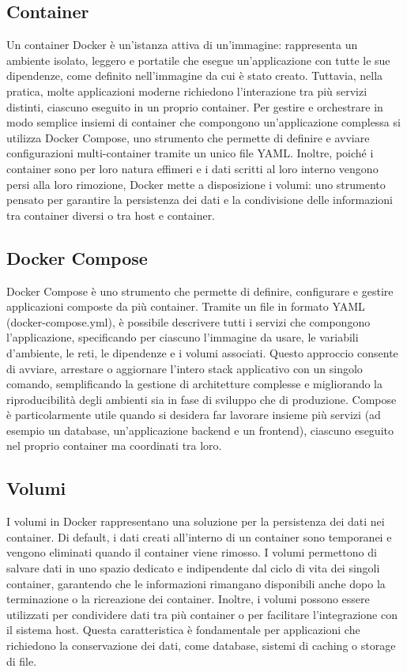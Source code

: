 \subsection{Container}
\label{sec:container}
Un container Docker è un’istanza attiva di un’immagine: rappresenta un ambiente isolato, leggero e portatile che esegue un’applicazione con tutte le sue dipendenze, come definito nell’immagine da cui è stato creato. Tuttavia, nella pratica, molte applicazioni moderne richiedono l’interazione tra più servizi distinti, ciascuno eseguito in un proprio container. Per gestire e orchestrare in modo semplice insiemi di container che compongono un’applicazione complessa si utilizza Docker Compose, uno strumento che permette di definire e avviare configurazioni multi-container tramite un unico file YAML.
Inoltre, poiché i container sono per loro natura effimeri e i dati scritti al loro interno vengono persi alla loro rimozione, Docker mette a disposizione i volumi: uno strumento pensato per garantire la persistenza dei dati e la condivisione delle informazioni tra container diversi o tra host e container.

\subsection{Docker Compose}
\label{sec:dockercompose}
Docker Compose è uno strumento che permette di definire, configurare e gestire applicazioni composte da più container. Tramite un file in formato YAML (docker-compose.yml), è possibile descrivere tutti i servizi che compongono l’applicazione, specificando per ciascuno l’immagine da usare, le variabili d’ambiente, le reti, le dipendenze e i volumi associati. Questo approccio consente di avviare, arrestare o aggiornare l’intero stack applicativo con un singolo comando, semplificando la gestione di architetture complesse e migliorando la riproducibilità degli ambienti sia in fase di sviluppo che di produzione. Compose è particolarmente utile quando si desidera far lavorare insieme più servizi (ad esempio un database, un’applicazione backend e un frontend), ciascuno eseguito nel proprio container ma coordinati tra loro.

\subsection{Volumi}
\label{sec:volumi}
I volumi in Docker rappresentano una soluzione per la persistenza dei dati nei container. Di default, i dati creati all’interno di un container sono temporanei e vengono eliminati quando il container viene rimosso. I volumi permettono di salvare dati in uno spazio dedicato e indipendente dal ciclo di vita dei singoli container, garantendo che le informazioni rimangano disponibili anche dopo la terminazione o la ricreazione dei container. Inoltre, i volumi possono essere utilizzati per condividere dati tra più container o per facilitare l’integrazione con il sistema host. Questa caratteristica è fondamentale per applicazioni che richiedono la conservazione dei dati, come database, sistemi di caching o storage di file.

